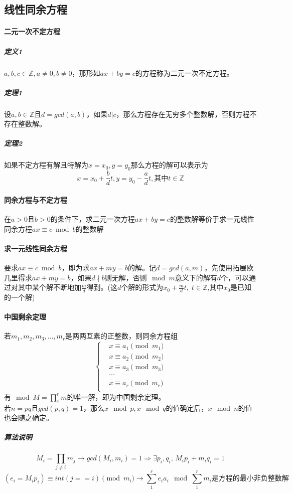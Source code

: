 \documentclass[]{cpp}
\begin{document}
\subsection{线性同余方程}
\paragraph{二元一次不定方程}
\subparagraph{定义1} $a,b,c\in\mathbb{Z},a\ne0,b\ne0$，那形如$ax+by=c$的方程称为二元一次不定方程。
\subparagraph{定理1} 设$a,b\in\mathbb{Z}$且$d=gcd(a,b)$，如果$d|c$，那么方程存在无穷多个整数解，否则方程不存在整数解。
\subparagraph{定理2} 如果不定方程有解且特解为$x=x_0,y=y_0$那么方程的解可以表示为$$x=x_0+\frac{b}{d}t,y=y_0-\frac{a}{d}t,\mbox{其中}t\in\mathbb{Z}$$
\paragraph{同余方程与不定方程} 在$a>0$且$b>0$的条件下，求二元一次方程$ax+by=c$的整数解等价于求一元线性同余方程$ax\equiv c\bmod{b}$的整数解
\paragraph{求一元线性同余方程}
	要求$ax\equiv c\bmod{b}$，即为求$ax+my=b$的解。记$d=gcd(a,m)$，先使用拓展欧几里得求$ax+my=b$，如果$d\nmid b$则无解，否则$\mod m$意义下的解有$d$个，可以通过对其中某个解不断地加$\frac{m}{d}$得到。(这$d$个解的形式为$x_0+\frac{m}{d}t,\;t\in\mathbb{Z}$,其中$x_0$是已知的一个解)
\paragraph{中国剩余定理}
	若$m_1,m_2,m_3,\ldots,m_r$是两两互素的正整数，则同余方程组
	\begin{equation}
	\left\{\begin{aligned}
		& x\equiv a_1\pmod{m_1}\\
		& x\equiv a_2\pmod{m_2}\\
		& x\equiv a_3\pmod{m_3}\\
		& \cdots\\
		& x\equiv a_r\pmod{m_r}\\
	\end{aligned}\right.
	\end{equation}
	有$\mod M=\prod\limits_1^r m$的唯一解，即为中国剩余定理。\\
	若$n=pq$且$gcd(p,q)=1$，那么$x\mod p,x\mod q$的值确定后，$x\mod n$的值也会随之确定。
\subparagraph{算法说明}
	$$M_i=\prod\limits_{j\ne i}m_j\to gcd(M_i,m_i)=1\Rightarrow \exists p_i,q_i,\,M_ip_i+m_iq_i=1$$
	$$(e_i=M_i p_i)\equiv int(j==i)\pmod{m_i} \to \sum\limits_1^r e_i a_i\mod{\sum\limits_1^r m_i}\mbox{是方程的最小非负整数解}$$
\end{document}
